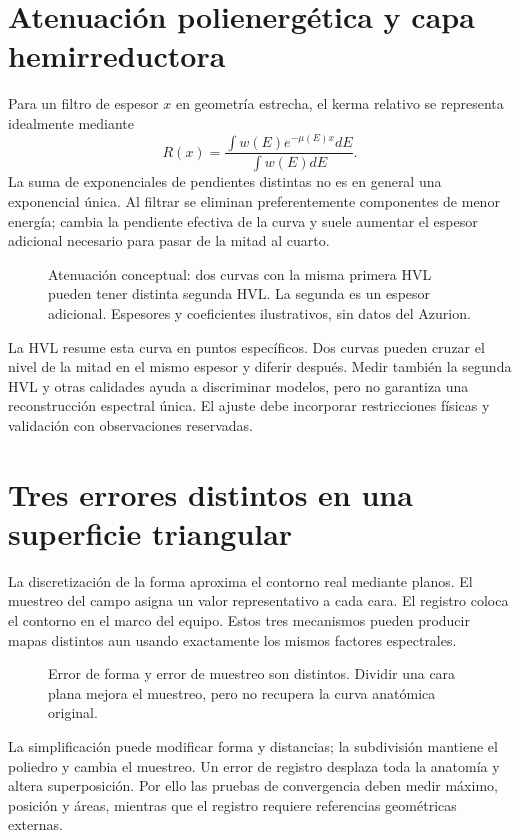 \section{Atenuación polienergética y capa hemirreductora}
Para un filtro de espesor $x$ en geometría estrecha, el kerma relativo se representa idealmente mediante
\begin{equation}
R(x)=\frac{\int w(E)e^{-\mu(E)x}dE}{\int w(E)dE}.
\end{equation}
La suma de exponenciales de pendientes distintas no es en general una exponencial única. Al filtrar se eliminan preferentemente componentes de menor energía; cambia la pendiente efectiva de la curva y suele aumentar el espesor adicional necesario para pasar de la mitad al cuarto.
\begin{figure}[H]\centering

\caption{Atenuación conceptual: dos curvas con la misma primera HVL pueden tener distinta segunda HVL. La segunda es un espesor adicional. Espesores y coeficientes ilustrativos, sin datos del Azurion.}
\end{figure}
La HVL resume esta curva en puntos específicos. Dos curvas pueden cruzar el nivel de la mitad en el mismo espesor y diferir después. Medir también la segunda HVL y otras calidades ayuda a discriminar modelos, pero no garantiza una reconstrucción espectral única. El ajuste debe incorporar restricciones físicas y validación con observaciones reservadas.

\section{Tres errores distintos en una superficie triangular}
La discretización de la forma aproxima el contorno real mediante planos. El muestreo del campo asigna un valor representativo a cada cara. El registro coloca el contorno en el marco del equipo. Estos tres mecanismos pueden producir mapas distintos aun usando exactamente los mismos factores espectrales.
\begin{figure}[H]\centering

\caption{Error de forma y error de muestreo son distintos. Dividir una cara plana mejora el muestreo, pero no recupera la curva anatómica original.}
\end{figure}
La simplificación puede modificar forma y distancias; la subdivisión mantiene el poliedro y cambia el muestreo. Un error de registro desplaza toda la anatomía y altera superposición. Por ello las pruebas de convergencia deben medir máximo, posición y áreas, mientras que el registro requiere referencias geométricas externas.


